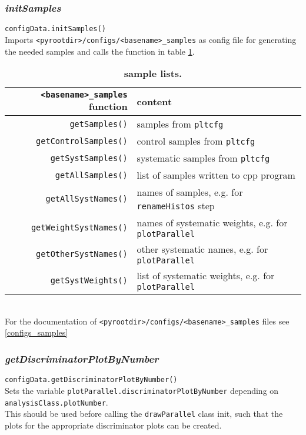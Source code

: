 \documentclass[12pt, a4paper]{article}
\begin{document}
\subsubsection{\textit{initSamples}}
\texttt{configData.initSamples()}\\
Imports \texttt{<pyrootdir>/configs/<basename>\_samples} as config file for generating the needed samples and calls the function in table \ref{sample lists}.

\begin{table}
\caption{\textbf{sample lists.}} \label{sample lists}
\begin{tabular}{r|l}
\texttt{<basename>\_samples} function & content  \\
\hline
\texttt{getSamples()} 			& 	samples from \texttt{pltcfg}	\\
\texttt{getControlSamples()} 	& 	control samples from \texttt{pltcfg}\\
\texttt{getSystSamples()} 		&	systematic samples from \texttt{pltcfg}\\
\texttt{getAllSamples()} 		&	list of samples written to cpp program\\
\hline
\texttt{getAllSystNames()} 		& 	names of samples, e.g. for \texttt{renameHistos} step\\
\texttt{getWeightSystNames()}	&	names of systematic weights, e.g. for \texttt{plotParallel}\\
\texttt{getOtherSystNames()} 	&	other systematic names, e.g. for \texttt{plotParallel}\\
\texttt{getSystWeights()} 		&	list of systematic weights, e.g. for \texttt{plotParallel}\\
\end{tabular}
\end{table}

~\\
For the documentation of \texttt{<pyrootdir>/configs/<basename>\_samples} files see \ref{configs_samples}


\subsubsection{\textit{getDiscriminatorPlotByNumber}}
\texttt{configData.getDiscriminatorPlotByNumber()}\\
Sets the variable \texttt{plotParallel.discriminatorPlotByNumber} depending on \texttt{analysisClass.plotNumber}.\\
This should be used before calling the \texttt{drawParallel} class init, such that the plots for the appropriate discriminator plots can be created.
\end{document}
